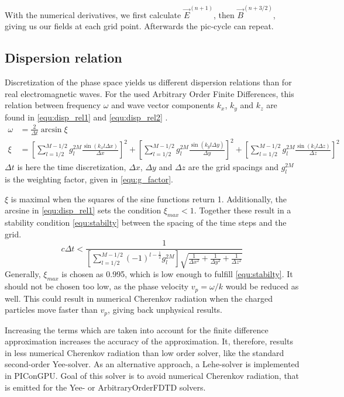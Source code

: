 \documentclass[bachelor_thesis]{subfiles}
\begin{document}
With the numerical derivatives, we first calculate $\vec{E}^{(n+1)}$, then $\vec{B}^{(n+3/2)}$, giving us our fields at each grid point. Afterwards the \gls{pic}-cycle can repeat.

\subsection{Dispersion relation}
Discretization of the phase space yields us different dispersion relations than for real electromagnetic waves. For the used Arbitrary Order Finite Differences, this relation
between frequency $\omega$ and wave vector components $k_x$, $k_y$ and $k_z$ are found in \autoref{equ:disp_rel1} and \autoref{equ:disp_rel2} \cite{PICRepo}.
\begin{align}
\omega&=\frac{2}{\Delta t} \arcsin  \xi 			\label{equ:disp_rel1}	\\
\xi &= \left[\sum\limits_{l=1/2}^{M - 1/2} g_l^{2M} \frac{\sin( k_x l \Delta x)}{\Delta x} \right]^2
	+ \left[\sum\limits_{l=1/2}^{M - 1/2} g_l^{2M} \frac{\sin( k_y l \Delta y)}{\Delta y} \right]^2 + \left[\sum\limits_{l=1/2}^{M - 1/2} g_l^{2M} \frac{\sin( k_z l \Delta z)}{\Delta z} \right]^2 	\label{equ:disp_rel2}
\end{align}
$\Delta t$ is here the time discretization, $\Delta x$, $\Delta y$ and $\Delta z$ are the grid spacings and $g_l^{2M}$ is the weighting factor, given in \autoref{equ:g_factor}.

$\xi$ is maximal when the squares of the sine functions return 1. Additionally, the arcsine in \autoref{equ:disp_rel1} sets the condition $\xi_{max} < 1$.
Together these result in a stability condition \autoref{equ:stabilty} between the spacing of the time steps and the grid.
\begin{equation}
c\Delta t < \frac{1}{ \left[ \sum\limits_{l=1/2}^{M - 1/2} (-1)^{l-\frac{1}{2}} g_l^{2M} \right] \sqrt{ \frac{1}{\Delta x^2} + \frac{1}{\Delta y^2} + \frac{1}{\Delta z^2} }}
\label{equ:stabilty}
\end{equation}
Generally, $\xi_{max}$ is chosen as 0.995, which is low enough to fulfill \autoref{equ:stabilty}. It should not be chosen too low, as the phase velocity $v_p=\omega/k$
would be reduced as well. This could result in numerical Cherenkov radiation when the charged particles move faster than $v_p$, giving back unphysical results.

Increasing the terms which are taken into account for the finite difference approximation increases the accuracy of the approximation. It, therefore, results in less numerical Cherenkov radiation than low order solver, like the standard second-order Yee-solver.
As an alternative approach, a Lehe-solver \cite{Lehe2013} is implemented in PIConGPU. Goal of this solver is to avoid numerical Cherenkov radiation, that is emitted for the Yee- or ArbitraryOrderFDTD solvers.
\end{document}
